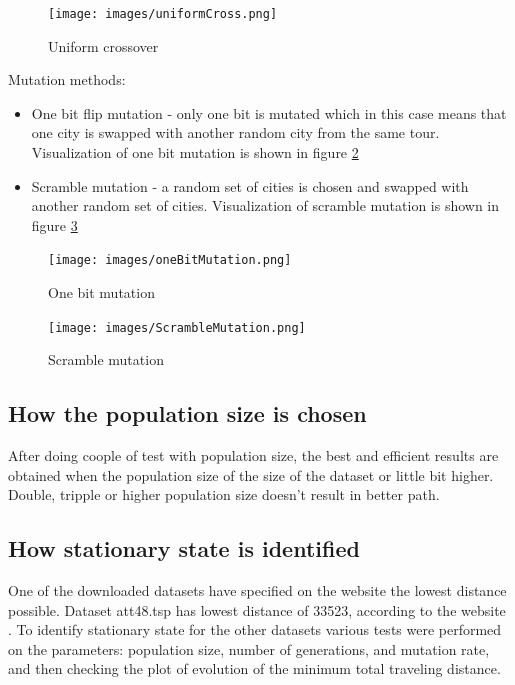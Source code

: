 \documentclass[12pt]{report}
\begin{document}
    \begin{figure}
        \centering
        \texttt{[image: images/uniformCross.png]}
        \caption{Uniform crossover}
        \label{fig:uniformCrossover}
    \end{figure}
    \noindent Mutation methods: \cite{MutationSource}
    \begin{itemize}
        \item One bit flip mutation - only one bit is mutated which in this case means that one city is swapped with another random city from the same tour. Visualization of one bit mutation is shown in figure \ref{fig:OneBitMutation}
        \item Scramble mutation - a random set of cities is chosen and swapped with another random set of cities. Visualization of scramble mutation is shown in figure \ref{fig:ScrambleMutation}
    \end{itemize}

    \begin{figure}
        \centering
        \texttt{[image: images/oneBitMutation.png]}
        \caption{One bit mutation}
        \label{fig:OneBitMutation}
    \end{figure}
    
    \begin{figure}
        \centering
        \texttt{[image: images/ScrambleMutation.png]}
        \caption{Scramble mutation}
        \label{fig:ScrambleMutation}
    \end{figure}
    
    \subsection{How the population size is chosen}
    After doing coople of test with population size, the best and efficient results are obtained when the population size of the size of the dataset or little bit higher. Double, tripple or higher population size doesn't result in better path.

    \subsection{How stationary state is identified}
    One of the downloaded datasets have specified on the website the lowest distance possible. Dataset att48.tsp has lowest distance of 33523, according to the website \cite{att48Data}. To identify stationary state for the other datasets various tests were performed on the parameters: population size, number of generations, and mutation rate, and then checking the plot of evolution of the minimum total traveling distance. 
\end{document}
